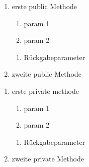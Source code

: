 \begin{enumerate}[+]
\item erste public Methode

\begin{enumerate}[$\bullet$]
\item param 1
\item param 2
\end{enumerate}
\vspace{-0.2cm}
\begin{enumerate}[$\circ$]
\item Rückgabeparameter
\end{enumerate}

\item zweite public Methode
\end{enumerate}

\begin{enumerate}[$-$]
\item erste private methode

\begin{enumerate}[$\bullet$]
\item param 1
\item param 2
\end{enumerate}
\vspace{-0.2cm}
\begin{enumerate}[$\circ$]
\item Rückgabeparameter
\end{enumerate}

\item zweite private Methode
\end{enumerate}